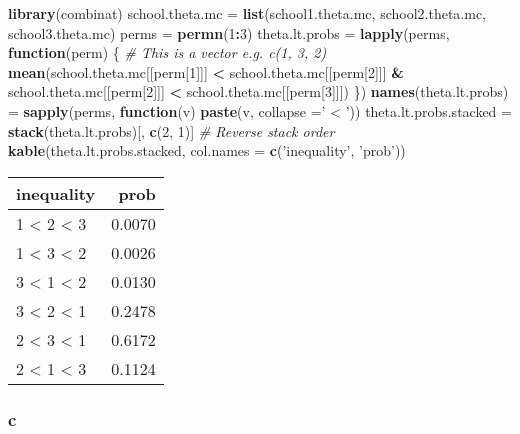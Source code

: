 \documentclass[]{article}
\newenvironment{Shaded}{\begin{snugshade}}{\end{snugshade}}
\newcommand{\CommentTok}[1]{\textcolor[rgb]{0.56,0.35,0.01}{\textit{#1}}}
\newcommand{\ControlFlowTok}[1]{\textcolor[rgb]{0.13,0.29,0.53}{\textbf{#1}}}
\newcommand{\DataTypeTok}[1]{\textcolor[rgb]{0.13,0.29,0.53}{#1}}
\newcommand{\DecValTok}[1]{\textcolor[rgb]{0.00,0.00,0.81}{#1}}
\newcommand{\KeywordTok}[1]{\textcolor[rgb]{0.13,0.29,0.53}{\textbf{#1}}}
\newcommand{\NormalTok}[1]{#1}
\newcommand{\OperatorTok}[1]{\textcolor[rgb]{0.81,0.36,0.00}{\textbf{#1}}}
\newcommand{\StringTok}[1]{\textcolor[rgb]{0.31,0.60,0.02}{#1}}
\begin{document}
\begin{Shaded}
\begin{Highlighting}[]
\KeywordTok{library}\NormalTok{(combinat)}
\NormalTok{school.theta.mc =}\StringTok{ }\KeywordTok{list}\NormalTok{(school1.theta.mc, school2.theta.mc, school3.theta.mc)}
\NormalTok{perms =}\StringTok{ }\KeywordTok{permn}\NormalTok{(}\DecValTok{1}\OperatorTok{:}\DecValTok{3}\NormalTok{)}
\NormalTok{theta.lt.probs =}\StringTok{ }\KeywordTok{lapply}\NormalTok{(perms, }\ControlFlowTok{function}\NormalTok{(perm) \{}
  \CommentTok{# This is a vector e.g. c(1, 3, 2)}
  \KeywordTok{mean}\NormalTok{(school.theta.mc[[perm[}\DecValTok{1}\NormalTok{]]] }\OperatorTok{<}\StringTok{ }\NormalTok{school.theta.mc[[perm[}\DecValTok{2}\NormalTok{]]] }\OperatorTok{&}
\StringTok{         }\NormalTok{school.theta.mc[[perm[}\DecValTok{2}\NormalTok{]]] }\OperatorTok{<}\StringTok{ }\NormalTok{school.theta.mc[[perm[}\DecValTok{3}\NormalTok{]]])}
\NormalTok{\})}
\KeywordTok{names}\NormalTok{(theta.lt.probs) =}\StringTok{ }\KeywordTok{sapply}\NormalTok{(perms, }\ControlFlowTok{function}\NormalTok{(v) }\KeywordTok{paste}\NormalTok{(v, }\DataTypeTok{collapse =}\StringTok{' < '}\NormalTok{))}
\NormalTok{theta.lt.probs.stacked =}\StringTok{ }\KeywordTok{stack}\NormalTok{(theta.lt.probs)[, }\KeywordTok{c}\NormalTok{(}\DecValTok{2}\NormalTok{, }\DecValTok{1}\NormalTok{)] }\CommentTok{# Reverse stack order}
\KeywordTok{kable}\NormalTok{(theta.lt.probs.stacked, }\DataTypeTok{col.names =} \KeywordTok{c}\NormalTok{(}\StringTok{'inequality'}\NormalTok{, }\StringTok{'prob'}\NormalTok{))}
\end{Highlighting}
\end{Shaded}

\begin{longtable}[]{@{}lr@{}}
\toprule
inequality & prob\tabularnewline
\midrule
\endhead
1 \textless{} 2 \textless{} 3 & 0.0070\tabularnewline
1 \textless{} 3 \textless{} 2 & 0.0026\tabularnewline
3 \textless{} 1 \textless{} 2 & 0.0130\tabularnewline
3 \textless{} 2 \textless{} 1 & 0.2478\tabularnewline
2 \textless{} 3 \textless{} 1 & 0.6172\tabularnewline
2 \textless{} 1 \textless{} 3 & 0.1124\tabularnewline
\bottomrule
\end{longtable}

\hypertarget{c}{%
\subsubsection{c}\label{c}}
\end{document}

